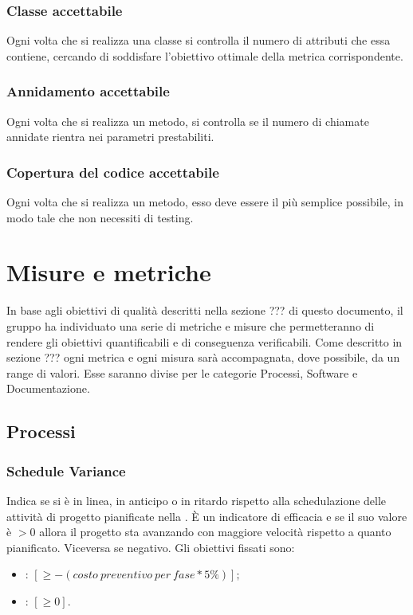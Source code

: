\subsubsection{Classe accettabile}
Ogni volta che si realizza una classe si controlla il numero di attributi che essa contiene, cercando di soddisfare l'obiettivo ottimale della metrica corrispondente.

\subsubsection{Annidamento accettabile}
Ogni volta che si realizza un metodo, si controlla se il numero di chiamate annidate rientra nei parametri prestabiliti.

\subsubsection{Copertura del codice accettabile}
Ogni volta che si realizza un metodo, esso deve essere il più semplice possibile, in modo tale che non necessiti di testing.

\newpage

\section{Misure e metriche}
In base agli obiettivi di qualità descritti nella sezione ??? di questo documento, il gruppo ha individuato una serie di metriche e misure che permetteranno di rendere gli obiettivi quantificabili e di conseguenza verificabili. Come descritto in sezione ??? ogni metrica e ogni misura sarà accompagnata, dove possibile, da un range di valori. Esse saranno divise per le categorie Processi, Software e Documentazione. 

\subsection{Processi}
\subsubsection{Schedule Variance}
Indica se si è in linea, in anticipo o in ritardo rispetto alla schedulazione delle attività di progetto pianificate nella . È un indicatore di efficacia e se il suo valore è $> 0$ allora il progetto sta avanzando con maggiore velocità rispetto a quanto pianificato. Viceversa se negativo.
Gli obiettivi fissati sono:
\begin{itemize}
\item {}: $ [\geq -(costo\:preventivo\:per\:fase * 5\%)]; $
\item {}: $ [\geq 0]. $
\end{itemize}

